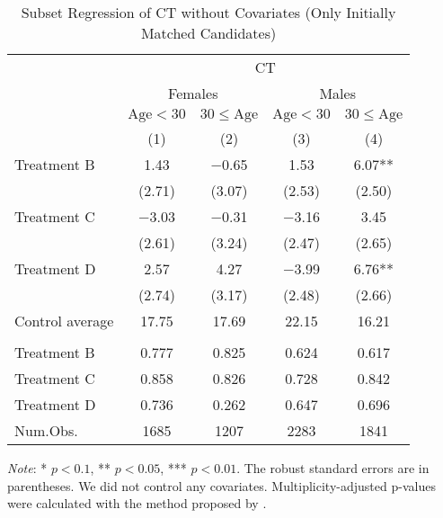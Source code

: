 \documentclass[12pt, a4paper]{article}
\begin{document}
\begin{table}[H]

\caption{\label{tab:lm-test-subset1-init}Subset Regression of CT without Covariates (Only Initially Matched Candidates)}
\centering
\fontsize{8}{10}\selectfont
\begin{threeparttable}
\begin{tabular}[t]{lcccc}
\toprule
\multicolumn{1}{c}{ } & \multicolumn{4}{c}{CT} \\
\cmidrule(l{3pt}r{3pt}){2-5}
\multicolumn{1}{c}{ } & \multicolumn{2}{c}{Females} & \multicolumn{2}{c}{Males} \\
\cmidrule(l{3pt}r{3pt}){2-3} \cmidrule(l{3pt}r{3pt}){4-5}
\multicolumn{1}{c}{ } & \multicolumn{1}{c}{$\text{Age} < 30$} & \multicolumn{1}{c}{$30 \le \text{Age}$} & \multicolumn{1}{c}{$\text{Age} < 30$} & \multicolumn{1}{c}{$30 \le \text{Age}$} \\
\cmidrule(l{3pt}r{3pt}){2-2} \cmidrule(l{3pt}r{3pt}){3-3} \cmidrule(l{3pt}r{3pt}){4-4} \cmidrule(l{3pt}r{3pt}){5-5}
  & (1) & (2) & (3) & (4)\\
\midrule
Treatment B & \num{1.43} & \num{-0.65} & \num{1.53} & \num{6.07}**\\
 & (\num{2.71}) & (\num{3.07}) & (\num{2.53}) & (\num{2.50})\\
Treatment C & \num{-3.03} & \num{-0.31} & \num{-3.16} & \num{3.45}\\
 & (\num{2.61}) & (\num{3.24}) & (\num{2.47}) & (\num{2.65})\\
Treatment D & \num{2.57} & \num{4.27} & \num{-3.99} & \num{6.76}**\\
 & (\num{2.74}) & (\num{3.17}) & (\num{2.48}) & (\num{2.66})\\
\midrule
Control average & 17.75 & 17.69 & 22.15 & 16.21\\
\addlinespace[0.3em]
\multicolumn{5}{l}{\textit{Multiplicity-adjusted p-values}}\\
\hspace{1em}Treatment B & 0.777 & 0.825 & 0.624 & 0.617\\
\hspace{1em}Treatment C & 0.858 & 0.826 & 0.728 & 0.842\\
\hspace{1em}Treatment D & 0.736 & 0.262 & 0.647 & 0.696\\
Num.Obs. & \num{1685} & \num{1207} & \num{2283} & \num{1841}\\
\bottomrule
\end{tabular}
\begin{tablenotes}
\item \emph{Note}: * $p < 0.1$, ** $p < 0.05$, *** $p < 0.01$. The robust standard errors are in parentheses. We did not control any covariates. Multiplicity-adjusted p-values were calculated with the method proposed by \cite{List2019}.
\end{tablenotes}
\end{threeparttable}
\end{table}
\end{document}

